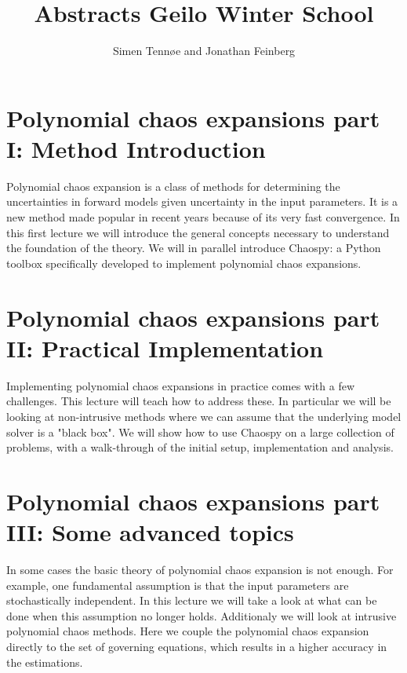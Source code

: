 \documentclass[a4paper,10pt]{article}
\title{Abstracts Geilo Winter School}
\author{Simen Tennøe and Jonathan Feinberg}
\begin{document}
\maketitle
\newpage


\section{Polynomial chaos expansions part I: Method Introduction}

Polynomial chaos expansion is a class of methods for determining the
uncertainties in forward models given uncertainty in the input parameters.
It is a new method made popular in recent years because of
its very fast convergence.
In this first lecture we will introduce the
general concepts necessary to understand the foundation of the theory.
We will in parallel introduce Chaospy: a Python
toolbox specifically developed to implement polynomial chaos
expansions.

\section{Polynomial chaos expansions part II: Practical Implementation}

Implementing polynomial chaos expansions in practice comes with a
few challenges. This lecture will teach how to address these.
In particular we will be looking at non-intrusive methods where we
can assume that the underlying model solver is a "black box".
We will show how to use Chaospy on a large collection of problems,
with a walk-through of the initial setup, implementation and analysis.

\section{Polynomial chaos expansions part III: Some advanced topics}

In some cases the basic theory of polynomial chaos expansion is not
enough.
For example, one fundamental assumption is that the
input parameters are stochastically independent.
In this lecture we will take a look at what
can be done when this assumption no longer holds.
Additionaly we will look at intrusive polynomial chaos
methods.
Here we couple the polynomial chaos expansion directly to
the set of governing equations, which results in a higher accuracy in
the estimations.
\end{document}
